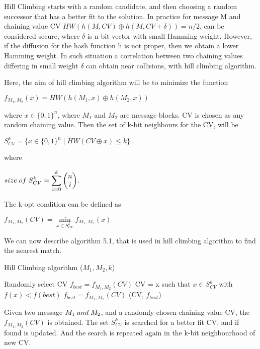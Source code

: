 Hill Climbing starts with a random candidate, and then choosing a random successor that has a better fit to the
solution. In practice for message M and chaining value CV $HW( h(M, CV) \oplus h(M, CV + \delta) ) = n / 2 $, can be considered
secure, where $\delta$ is n-bit vector with small Hamming weight. However, if the diffusion for the hash function h is 
not proper, then we obtain a lower Hamming weight. In such situation a correlation between two chaining values differing
in small weight $\delta$ can obtain near collisions, with hill climbing algorithm.

Here, the aim of hill climbing algorithm will be to minimize the function 

$f_{M_{1}, M_{2}}(x) = HW( h(M_{1}, x) \oplus h(M_{2}, x) )$

where $x \in \{0, 1\}^{n}$, where $M_{1}$ and $M_{2}$ are message blocks. CV is chosen as any random chaining value. Then the 
set of k-bit neighbours for the CV, will be 

$S^{k}_{CV} = \{ x \in \{0, 1\}^{n} \mid HW( CV \oplus x ) \leq k \}$

where 

$ size \thickspace of \thickspace S^{k}_{CV} = \displaystyle \sum \limits_{i = 0}^{k} \begin{pmatrix} n \\ i \end{pmatrix}$.

The k-opt condition can be defined as 

$f_{M_{1}, M_{2}} (CV) =  \min\limits_{x \in S^{k}_{CV}} f_{M_{1}, M_{2}} (x)$

We can now describe algorithm 5.1, that is used in hill climbing algorithm to find the nearest match. 

\begin{algorithm}
  \caption{ Hill Climbing algorithm ($M_{1}, M_{2}, k$) }
  \begin{algorithmic}[1]
    \State Randomly select CV
    \State $f_{best} = f_{M_{1}, M_{2}}(CV)$
    \State {}
    \State CV = x such that $x \in S^{k}_{CV}$ with $f(x) < f(best)$
    \State $f_{best} = f_{M_{1}, M_{2}}(CV)$
    \State \EndWhile
    \State \Return (CV, $f_{best}$)
  \end{algorithmic}
\end{algorithm}

Given two message $M_{1} \thickspace and \thickspace M_{2}$, and a randomly chosen chaining value CV, the $f_{M_{1}, M_{2}}(CV)$
is obtained. The set $S^{k}_{CV}$ is searched for a better fit CV, and if found is updated. And the search is repeated again
in the k-bit neighbourhood of new CV.

